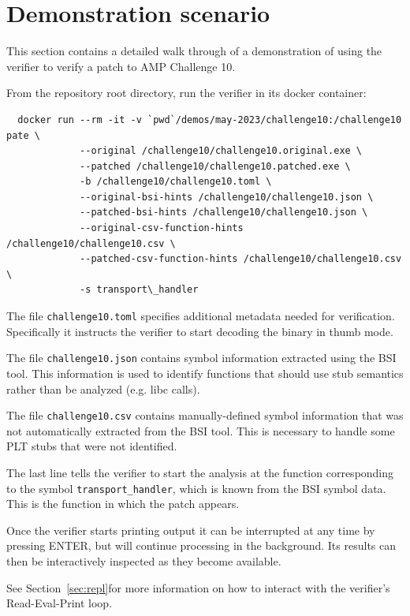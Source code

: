 \section{Demonstration scenario}
\label{sec:demonstr-scen}

This section contains a detailed walk through of a demonstration of using the verifier to verify a patch to AMP Challenge 10.

From the repository root directory, run the verifier in its docker container:
\begin{verbatim}
  docker run --rm -it -v `pwd`/demos/may-2023/challenge10:/challenge10 pate \
             --original /challenge10/challenge10.original.exe \
             --patched /challenge10/challenge10.patched.exe \
             -b /challenge10/challenge10.toml \
             --original-bsi-hints /challenge10/challenge10.json \
             --patched-bsi-hints /challenge10/challenge10.json \
             --original-csv-function-hints /challenge10/challenge10.csv \
             --patched-csv-function-hints /challenge10/challenge10.csv \
             -s transport\_handler
\end{verbatim}

The file \texttt{challenge10.toml} specifies additional metadata needed for verification.
Specifically it instructs the verifier to start decoding the binary in thumb mode.

The file \texttt{challenge10.json} contains symbol information extracted using the BSI tool.
This information is used to identify functions that should use stub semantics rather than be analyzed (e.g. libc calls).

The file \texttt{challenge10.csv} contains manually-defined symbol information that was not automatically extracted from the BSI tool.
This is necessary to handle some PLT stubs that were not identified.

The last line tells the verifier to start the analysis at the function corresponding to the symbol \texttt{transport\_handler}, which is known from the BSI symbol data.
This is the function in which the patch appears.

Once the verifier starts printing output it can be interrupted at any time by pressing ENTER, but will continue processing in the background.
Its results can then be interactively inspected as they become available.

See Section~\ref{sec:repl}for more information on how to interact with the verifier's Read-Eval-Print loop.

